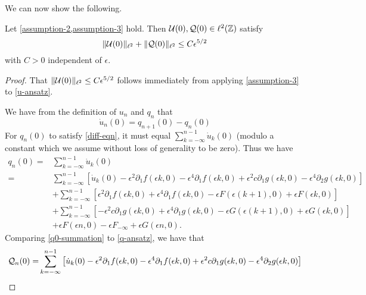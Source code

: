 We can now show the following.
\begin{lem}\label{initial-conditions-lem}
	Let \cref{assumption-2,assumption-3} hold. Then \(\mathcal{U}(0),\mathcal{Q}(0) \in \ell^2(\mathbb{Z})\) satisfy
	\begin{equation}\label{initial-condition-ineq}
		\| \mathcal{U}(0) \|_{\ell^2} + \|\mathcal{Q}(0)\|_{\ell^2} \leq C \epsilon^{5/2}
	\end{equation}
	with \(C>0\) independent of \(\epsilon\).
\end{lem}

\begin{proof}
	That \(\|\mathcal{U}(0)\|_{\ell^2}\leq C \epsilon^{5/2}\) follows immediately from applying \cref{assumption-3} to \cref{u-ansatz}.
	
	We have from the definition of \(u_n\) and \(q_n\) that
	\begin{equation}\label{diff-eqn}
		\dot u_n(0) = q_{n+1}(0) - q_n(0)
	\end{equation}
	For \(q_n(0)\) to satisfy \cref{diff-eqn}, it must equal \(\sum_{k=-\infty}^{n-1} \dot u_k(0)\) (modulo a constant which we assume without loss of generality to be zero). Thus we have
	\begin{equation}\label{q0-summation}
	\begin{aligned}	
		q_n(0) =& \sum_{k=-\infty}^{n-1} \dot u_k(0)\\
		=& \sum_{k=-\infty}^{n-1}\left[ \dot u_k(0) - \epsilon^2 \partial_1 f(\epsilon k,0) - \epsilon^4 \partial_1 f(\epsilon k,0) + \epsilon^2 c \partial_1 g(\epsilon k,0) - \epsilon^4 \partial_2g(\epsilon k,0)\right] \\
		&+\sum_{k=-\infty}^{n-1}\left[  \epsilon^2 \partial_1 f(\epsilon k,0) +\epsilon^4 \partial_1 f(\epsilon k,0) - \epsilon F(\epsilon(k+1),0) +\epsilon F(\epsilon k ,0)  \right] \\
		&+ \sum_{k=-\infty}^{n-1}\left[ - \epsilon^2 c\partial_1 g(\epsilon k,0) +\epsilon^4 \partial_1 g(\epsilon k,0) - \epsilon G(\epsilon(k+1),0) +\epsilon G(\epsilon k ,0)  \right] \\
		&+ \epsilon F(\epsilon n, 0) - \epsilon F_{-\infty} + \epsilon G(\epsilon n, 0).
	\end{aligned}
	\end{equation}
	Comparing \cref{q0-summation} to \cref{q-ansatz}, we have that 
	 \begin{equation*}\label{mcq-zero}
	 \begin{aligned}
		\mcQ_n(0) =& \sum_{k=-\infty}^{n-1}\left[ \dot u_k(0) - \epsilon^2 \partial_1 f(\epsilon k,0) - \epsilon^4 \partial_1 f(\epsilon k,0) + \epsilon^2 c \partial_1 g(\epsilon k,0) - \epsilon^4 \partial_2g(\epsilon k,0)\right] \\

\end{aligned}
\end{equation*}
\end{proof}
